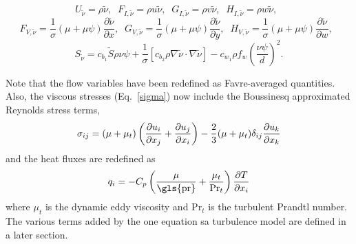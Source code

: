 \begin{equation}
U_{\tilde\nu} = \rho\tilde\nu, \;\; 
F_{I, \tilde\nu} = \rho u \tilde\nu, \;\; 
G_{I, \tilde\nu} = \rho v \tilde\nu, \;\; 
H_{I, \tilde\nu} = \rho w \tilde\nu, \;\; 
\end{equation}
\begin{equation}
F_{V, \tilde\nu} = \frac{1}{\sigma}(\mu + \mu \psi)\frac{\partial \tilde \nu}{\partial x}, \;\;
G_{V, \tilde\nu} = \frac{1}{\sigma}(\mu + \mu \psi)\frac{\partial \tilde \nu}{\partial y}, \;\;
H_{V, \tilde\nu} = \frac{1}{\sigma}(\mu + \mu \psi)\frac{\partial \tilde \nu}{\partial w}, \;\;
\end{equation}
\begin{equation}
S_{\tilde\nu} = c_{b_1}\tilde S \rho\nu\psi + \frac{1}{\sigma}\left[c_{b_2}\rho\nabla\tilde\nu\cdot\nabla\tilde\nu\right] - c_{w_1}\rho f_w \left(\frac{\nu\psi}{d}\right)^2.
\end{equation}

Note that the flow variables have been redefined as Favre-averaged quantities. Also, the viscous stresses (Eq.~\ref{sigma}) now include the Boussinesq approximated Reynolds stress terms,
\begin{equation}
\sigma_{ij} = (\mu+\mu_t)\left( \frac{\partial u_i}{\partial x_j}
+ \frac{\partial u_j}{\partial x_i} \right)
- \frac{2}{3}(\mu+\mu_t) \delta_{ij}\frac{\partial u_k}{\partial x_k}
\end{equation}
and the heat fluxes are redefined as
\begin{equation}
q_i = -C_p\l( \frac{\mu}{\mbox{\gls{pr}}} + \frac{\mu_t}{\text{Pr}_t}\r)\frac{\partial T}{\partial x_i}
\end{equation}
where $\mu_t$ is the dynamic eddy viscosity and $\text{Pr}_t$ is the turbulent Prandtl number. The various terms added by the one equation \gls{sa} turbulence model are defined in a later section.
